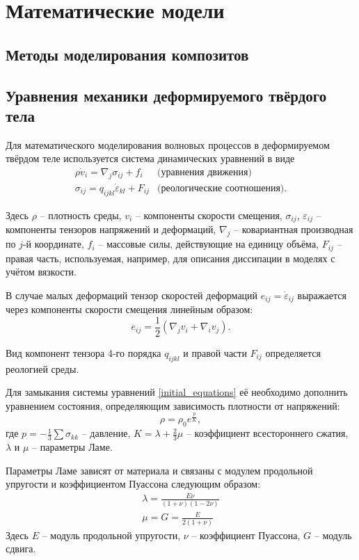 \section{Математические модели}

\subsection{Методы моделирования композитов}

\subsection{Уравнения механики деформируемого твёрдого тела}
Для математического моделирования волновых процессов в деформируемом твёрдом
теле используется система динамических уравнений \cite{novatsky,sedov} в виде
\begin{eqnarray}
\label{initial_equations}
\rho\dot{v}_i=\nabla_j\sigma_{ij}+f_i & \textrm{(уравнения движения)}\nonumber\\
\sigma_{ij}=q_{ijkl}\dot{\varepsilon}_{kl}+F_{ij} & \textrm{(реологические
соотношения).}
\end{eqnarray}

Здесь $\rho$ – плотность среды, $v_i$ – компоненты скорости смещения,
$\sigma_{ij}$, $\varepsilon_{ij}$ -- компоненты тензоров напряжений и деформаций,
$\nabla_j$ – ковариантная производная по $j$-й координате, $f_i$ – массовые
силы, действующие на единицу объёма, $F_{ij}$ -- правая часть, используемая, например, для описания диссипации в моделях с учётом вязкости.

В случае малых деформаций тензор скоростей деформаций $e_{ij}=\dot{\varepsilon}_{ij}$ 
выражается через компоненты скорости смещения линейным образом:
\begin{equation}
e_{ij}=\frac{1}{2}(\nabla_j v_i+\nabla_i v_j).
\end{equation}

Вид компонент тензора 4-го порядка $q_{ijkl}$ и правой части $F_{ij}$ определяется реологией среды.

Для замыкания системы уравнений \ref{initial_equations} её необходимо дополнить
уравнением состояния, определяющим зависимость плотности от напряжений:
$$\rho=\rho_0e^{\frac{p}{K}},$$
где $p=-\frac{1}{3}\sum\sigma_{kk}$ -- давление, $K=\lambda+\frac{2}{3}\mu$ --
коэффициент всестороннего сжатия, $\lambda$ и $\mu$ -- параметры Ламе.

Параметры Ламе зависят от материала и связаны с модулем продольной упругости и коэффициентом Пуассона следующим образом:
\begin{eqnarray}
\label{lame_parameters}
\lambda=\frac{E\nu}{(1+\nu)(1-2\nu)}
\nonumber\\
\mu=G=\frac{E}{2(1+\nu)}
\end{eqnarray}
Здесь $E$ -- модуль продольной упругости, $\nu$ -- коэффициент Пуассона, $G$ -- модуль сдвига.


